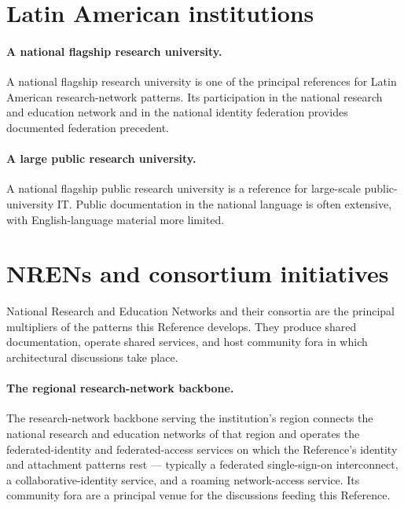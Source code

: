 \section{Latin American institutions}
\label{sec:ip-latin-america}

\paragraph{A national flagship research university.} A national
flagship research university is one of the principal references
for Latin American research-network patterns. Its participation in
the national research and education network and in the national
identity federation provides documented federation precedent.

\paragraph{A large public research university.} A national
flagship public research university is a reference for large-scale
public-university IT. Public documentation in the national
language is often extensive, with English-language material more
limited.

\section{NRENs and consortium initiatives}
\label{sec:ip-nrens}

National Research and Education Networks and their consortia are
the principal multipliers of the patterns this Reference
develops. They produce shared documentation, operate shared
services, and host community fora in which architectural
discussions take place.

\paragraph{The regional research-network backbone.} The
research-network backbone serving the institution's region
connects the national research and education networks of that
region and operates the federated-identity and federated-access
services on which the Reference's identity and attachment
patterns rest --- typically a federated single-sign-on
interconnect, a collaborative-identity service, and a roaming
network-access service. Its community fora are a principal venue
for the discussions feeding this Reference.

